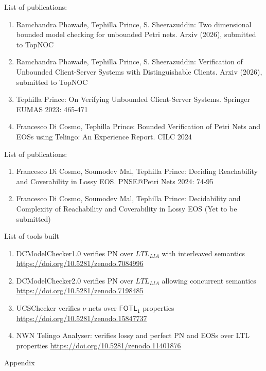 \documentclass [serif,professionalfont]{beamer}
\newcommand{\LC}{$LTL_{LIA}$}
\newcommand{\Lstar}{$\mathsf{FOTL_1}$}
\begin{document}
\begin{frame}{List of publications:}
    \begin{enumerate}
        \item Ramchandra Phawade, Tephilla Prince, S. Sheerazuddin:
              Two dimensional bounded model checking for unbounded Petri nets. Arxiv (2026),  submitted to TopNOC
        \item Ramchandra Phawade, Tephilla Prince, S. Sheerazuddin: Verification of Unbounded Client-Server Systems with Distinguishable Clients. Arxiv (2026), submitted to TopNOC
        \item   Tephilla Prince:
              On Verifying Unbounded Client-Server Systems. Springer EUMAS 2023: 465-471
        \item   Francesco Di Cosmo, Tephilla Prince:
              Bounded Verification of Petri Nets and EOSs using Telingo: An Experience Report. CILC 2024


    \end{enumerate}
\end{frame}

\begin{frame}{List of publications:}
    \begin{enumerate}

        \item[5]   Francesco Di Cosmo, Soumodev Mal, Tephilla Prince:
            Deciding Reachability and Coverability in Lossy EOS. PNSE@Petri Nets 2024: 74-95

        \item[6] Francesco Di Cosmo, Soumodev Mal, Tephilla Prince: Decidability and Complexity of Reachability and Coverability in Lossy EOS (Yet to be submitted)




    \end{enumerate}
\end{frame}


\begin{frame}{List of tools built}
    \begin{enumerate}
        \item DCModelChecker1.0 verifies PN over {\LC} with interleaved semantics \url{https://doi.org/10.5281/zenodo.7084996}
        \item DCModelChecker2.0 verifies PN over {\LC} allowing concurrent semantics \url{https://doi.org/10.5281/zenodo.7198485}
        \item UCSChecker verifies $\nu$-nets over {\Lstar} properties \url{https://doi.org/10.5281/zenodo.15847737}
        \item NWN Telingo Analyser: verifies lossy and perfect PN and EOSs over LTL properties \url{https://doi.org/10.5281/zenodo.11401876}
    \end{enumerate}

\end{frame}
\appendix
\begin{frame}
    \centering
    \huge{Appendix}
\end{frame}
\end{document}
